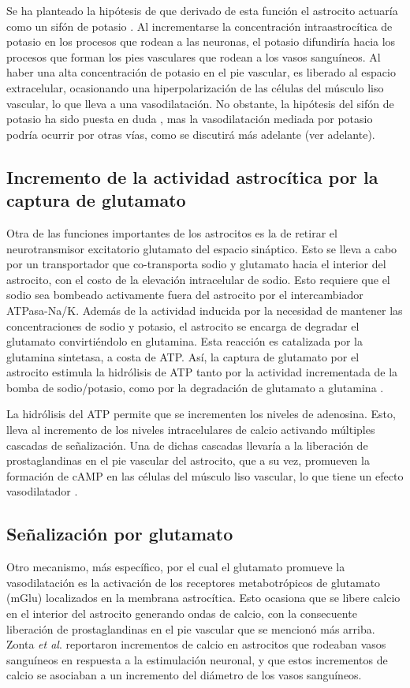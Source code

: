 Se ha planteado la hipótesis de que derivado de esta función el astrocito actuaría como un sifón de potasio \cite{PaulsonOB1987}. Al incrementarse la concentración intraastrocítica de potasio en los procesos que rodean a las neuronas, el potasio difundiría hacia los procesos que forman los pies vasculares que rodean a los vasos sanguíneos. Al haber una alta concentración de potasio en el pie vascular, es liberado al espacio extracelular, ocasionando una hiperpolarización de las células del músculo liso vascular, lo que lleva a una vasodilatación. No obstante, la hipótesis del sifón de potasio ha sido puesta en duda \cite{MeteaMR2007}, mas la vasodilatación mediada por potasio podría ocurrir por otras vías, como se discutirá más adelante (ver adelante).

\subsection{Incremento de la actividad astrocítica por la captura de glutamato}
Otra de las funciones importantes de los astrocitos es la de retirar el neurotransmisor excitatorio glutamato del espacio sináptico. Esto se lleva a cabo por un transportador que co-transporta sodio y glutamato hacia el interior del astrocito, con el costo de la elevación intracelular de sodio. Esto requiere que el sodio sea bombeado activamente fuera del astrocito por el intercambiador ATPasa-Na/K. Además de la actividad inducida por la necesidad de mantener las concentraciones de sodio y potasio, el astrocito se encarga de degradar el glutamato convirtiéndolo en glutamina. Esta reacción es catalizada por la glutamina sintetasa, a costa de ATP. Así, la captura de glutamato por el astrocito estimula la hidrólisis de ATP tanto por la actividad incrementada de la bomba de sodio/potasio, como por la degradación de glutamato a glutamina \cite{MagistrettiPJ1998,PellerinL1994}.

La hidrólisis del ATP permite que se incrementen los niveles de adenosina. Esto, lleva al incremento de los niveles intracelulares de calcio activando múltiples cascadas de señalización. Una de dichas cascadas llevaría a la liberación de prostaglandinas en el pie vascular del astrocito, que a su vez, promueven la formación de cAMP en las células del músculo liso vascular, lo que tiene un efecto vasodilatador \cite{KoehlerRC2009}.

\subsection{Señalización por glutamato}
Otro mecanismo, más específico, por el cual el glutamato promueve la vasodilatación es la activación de los receptores metabotrópicos de glutamato (mGlu) localizados en la membrana astrocítica. Esto ocasiona que se libere calcio en el interior del astrocito generando ondas de calcio, con la consecuente liberación de prostaglandinas en el pie vascular que se mencionó más arriba. Zonta \emph{et al}.\cite{ZontaM2003} reportaron incrementos de calcio en astrocitos que rodeaban vasos sanguíneos en respuesta a la estimulación neuronal, y que estos incrementos de calcio se asociaban a un incremento del diámetro de los vasos sanguíneos.

